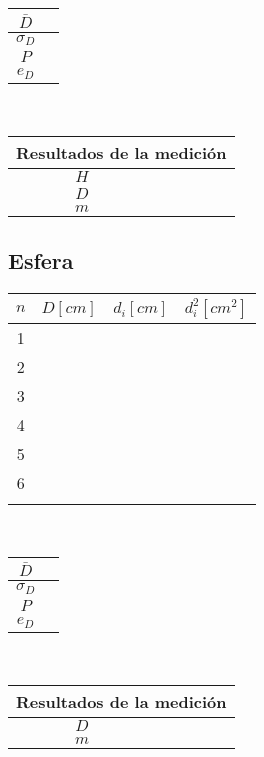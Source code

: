 \documentclass[letter,twoside,11pt]{article}
\begin{document}
\vspace{0.5cm}
\begin{tabular}{|c|p{2.0cm}|}
\hline
$\bar{D}$ & \\ \hline
$\sigma_D$ & \\ \hline
$P$ & \\ \hline
$e_D$ & \\ \hline
\end{tabular}\\

\vspace{1.4cm}
\begin{tabular}{|c|p{2.0cm}|}
\hline
\multicolumn{2}{|c|}{Resultados de la medición} \\ \hline
$H$ & \\ \hline
$D$ & \\ \hline
$m$ & \\ \hline
\end{tabular}

\subsection{Esfera}
\begin{tabular}{|c|>{\centering}m{2.0cm}<{\centering}
                  |>{\centering}m{2.0cm}<{\centering}
                  |>{\centering}m{2.0cm}<{\centering}|}
\hline
\textbf{$n$} & \textbf{$D[cm]$}
             & \textbf{$d_i[cm]$}
             & \textbf{$d_i^2[cm^2]$} \tabularnewline \hline
1 & & & \\ \hline
2 & & & \\ \hline
3 & & & \\ \hline
4 & & & \\ \hline
5 & & & \\ \hline
6 & & & \\ \hline
 & & & \\ \hline
\end{tabular}\\

\vspace{0.5cm}
\begin{tabular}{|c|p{2.0cm}|}
\hline
$\bar{D}$ & \\ \hline
$\sigma_D$ & \\ \hline
$P$ & \\ \hline
$e_D$ & \\ \hline
\end{tabular}\\

\vspace{1.4cm}
\begin{tabular}{|c|p{2.0cm}|}
\hline
\multicolumn{2}{|c|}{Resultados de la medición} \\ \hline
$D$ & \\ \hline
$m$ & \\ \hline
\end{tabular}
\end{document}
